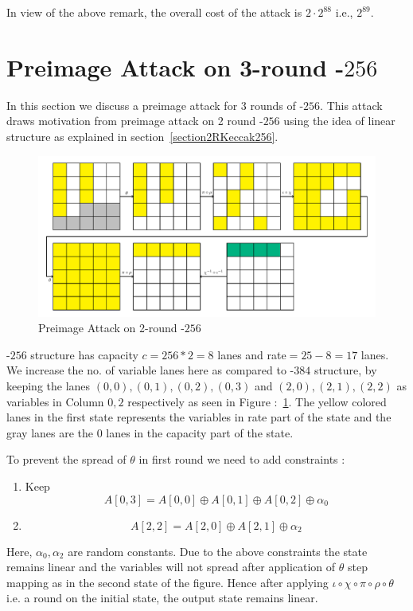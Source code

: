 In view of the above remark, the overall cost of the attack is $2\cdot 2^{88}$ i.e., $2^{89}$.

\section{Preimage Attack on 3-round \Keccak-$256$}
In this section we discuss a preimage attack for 3 rounds of \KECCAK-$256$. This attack draws motivation from preimage attack on 2 round \Keccak-$256$ using the idea of linear structure as explained in section~\ref{section2RKeccak256}. 

\begin{figure}
        \centering
        \includegraphics[scale=0.6]{3Rkeccak256.pdf}
        \caption{Preimage Attack on 2-round \KECCAK-$256$}
        \label{fig:3rkeccak256}
\end{figure}

\Keccak-$256$ structure has capacity $c = 256*2 = 8$ lanes and rate$ =  25 - 8 = 17$ lanes. We increase the no. of variable lanes here as compared to \Keccak-$384$ structure, by keeping the lanes $(0,0), (0,1), (0,2), (0,3)$ and $(2,0), (2,1), (2,2)$ as variables in Column $0, 2$ respectively as seen in Figure :~\ref{fig:3rkeccak256}. The yellow colored lanes in the first state represents the variables in rate part of the state and the gray lanes are the $0$ lanes in the capacity part of the state.

To prevent the spread of $\theta$ in first round we need to add constraints :
\begin{enumerate}
\item Keep \[
        A[0,3] = A[0,0] \oplus A[0,1] \oplus A[0, 2] \oplus \alpha_0
    \]
\item \[
        A[2,2] = A[2,0] \oplus A[2,1] \oplus \alpha_2
    \]
\end{enumerate}
Here, $\alpha_0, \alpha_2$ are random constants.
Due to the above constraints the state remains linear and the variables will not spread after application of $\theta$ step mapping as in the second state of the figure. Hence after applying $\iota \circ \chi \circ \pi \circ \rho \circ \theta $ i.e. a round on the initial state, the output state remains linear.

